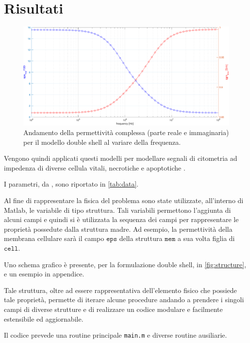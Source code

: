 \section{Risultati}


\begin{figure}[t!]
	\centering
	\includegraphics[width=0.95\linewidth]{../code/figs/epstilde_mix_plot}
	\caption{Andamento della permettività complessa (parte reale e immaginaria) per il modello double shell al variare della frequenza.}
	\label{fig:epstildemixplot}
\end{figure}



Vengono quindi applicati questi modelli per modellare segnali di citometria ad impedenza di diverse cellula vitali, necrotiche e apoptotiche \cite{de_ninno_high-throughput_2020}.

I parametri, da \citeauthor{de_ninno_high-throughput_2020}, sono riportato in \cref{tab:data}.

Al fine di rappresentare la fisica del problema sono state utilizzate, all'interno di Matlab, le variabile di tipo struttura. Tali variabili permettono l'aggiunta di alcuni campi e quindi si è utilizzata la sequenza dei campi per rappresentare le proprietà possedute dalla struttura madre. Ad esempio, la permettività della membrana cellulare sarà il campo $\mathtt{eps}$ della struttura $\mathtt{mem}$ a sua volta figlia di $\mathtt{cell}$. 

Uno schema grafico è presente, per la formulazione double shell, in \cref{fig:structure}, e un esempio in appendice.

Tale struttura, oltre ad essere rappresentativa dell'elemento fisico che possiede tale proprietà, permette di iterare alcune procedure andando a prendere i singoli campi di diverse strutture e di realizzare un codice modulare e facilmente estensibile ed aggiornabile.

Il codice prevede una routine principale \texttt{main.m} e diverse routine ausiliarie.

